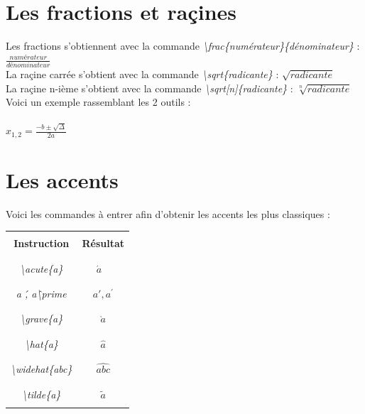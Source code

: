\documentclass[a4paper, 10pt]{book}
\begin{document}
\section{Les fractions et raçines\\}

Les fractions s'obtiennent avec la commande \textit{\textbackslash frac\{numérateur\}\{dénominateur\}} :  \\ 
 $\frac{numérateur}{dénominateur} $ \\

La raçine carrée s'obtient avec la commande \textit{\textbackslash sqrt\{radicante\}} : 
$\sqrt{radicante}$ \\
La raçine n-ième s'obtient avec la commande \textit{\textbackslash sqrt[n]\{radicante\}} : 
$\sqrt[n]{radicante} $\\

Voici un exemple rassemblant les 2 outils : \\ \\
$ x_{1,2} = \frac{ -b \pm \sqrt{\Delta}}{2a} $ \\

\section{Les accents}

Voici les commandes à entrer afin d'obtenir les accents les plus classiques : 

\begin{center}
\begin{tabular}{|c|c|}
\hline \\
\textbf{Instruction} & \textbf{Résultat} \\ \\
\hline \hline \\
\textit{\textbackslash acute\{a\}} & $\acute{a}$ \ \\ \\
\hline \\
\textit{ a \', a\^  \textbackslash prime} & $ a', a^\prime $  \\ \\
\hline \\
\textit{\textbackslash grave\{a\}} & $ \grave{a} $ \\ \\
\hline \\
\textit{\textbackslash hat\{a\}} & $\hat{a} $ \\ \\
\hline \\
\textit{\textbackslash widehat\{abc\}} & $\widehat{abc}$ \\ \\
\hline \\
\textit{\textbackslash tilde\{a\}} & $ \tilde{a} $ \\ \\
\hline
\end{tabular}
\end{center}
\end{document}
